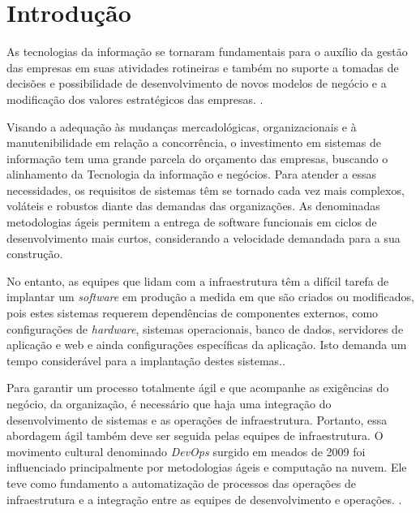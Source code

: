 \section{\esp Introdução}

As tecnologias da informação se tornaram fundamentais para o auxílio da gestão das empresas em suas atividades rotineiras e também no suporte a tomadas de decisões e possibilidade de desenvolvimento de novos modelos de negócio e a modificação dos valores estratégicos das empresas. \cite{audy}.

Visando a adequação às mudanças mercadológicas, organizacionais e à manutenibilidade em relação a concorrência, o investimento em sistemas de informação tem uma grande parcela do orçamento das empresas, buscando o alinhamento da Tecnologia da informação e negócios. \cite{luftman}  
Para atender a essas necessidades, os requisitos de sistemas têm se tornado cada vez mais complexos, voláteis e robustos diante das demandas das organizações. As denominadas metodologias ágeis permitem a entrega de software funcionais em ciclos de desenvolvimento mais curtos, considerando a velocidade demandada para a sua construção. \cite{sbbrocco} 
          
No entanto, as equipes que lidam com a infraestrutura têm a difícil tarefa de implantar um \textit{software} em produção a medida em que são criados ou modificados, pois estes sistemas requerem dependências de componentes externos, como configurações de \textit{hardware}, sistemas operacionais, banco de dados, servidores de aplicação e web e ainda configurações específicas da aplicação. Isto demanda um tempo considerável para a implantação destes sistemas.\cite{sato}.

Para garantir um processo totalmente ágil e que acompanhe as exigências do negócio, da organização, é necessário que haja uma integração do desenvolvimento de sistemas e as operações de infraestrutura. Portanto, essa abordagem ágil também deve ser seguida pelas equipes de infraestrutura. O movimento cultural denominado \textit{DevOps} surgido em meados de 2009 foi influenciado principalmente por metodologias ágeis e computação na nuvem. Ele teve como fundamento a automatização de processos das operações de infraestrutura e a integração entre as equipes de desenvolvimento e operações.  \cite{sato}.

